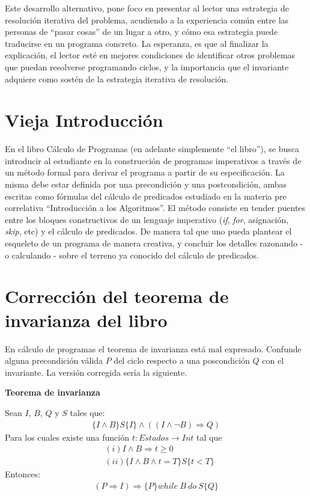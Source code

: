 \documentclass[12pt, a4paper, openany, fleqn]{book}
\begin{document}
    Este desarrollo alternativo, pone foco en presentar al lector una estrategia de resolución iterativa del problema, acudiendo a la experiencia común entre las personas de ``pasar cosas'' de un lugar a otro, y cómo esa estrategia puede traducirse en un programa concreto.
    La esperanza, es que al finalizar la explicación, el lector esté en mejores condiciones de identificar otros problemas que puedan resolverse programando ciclos, y la importancia que el invariante adquiere como sostén de la estrategia iterativa de resolución.

    \section{Vieja Introducción}
    En el libro Cálculo de Programas (en adelante simplemente ``el libro''), se busca introducir al estudiante en la construcción de programas imperativos a través de un método formal para derivar el programa a partir de su especificación. La misma debe estar definida por una precondición y una postcondición, ambas escritas como fórmulas del cálculo de predicados estudiado en la materia pre correlativa ``Introducción a los Algoritmos''. El método consiste en tender puentes entre los bloques constructivos de un lenguaje imperativo (\textit{if}, \textit{for}, asignación, \textit{skip}, etc) y el cálculo de predicados. De manera tal que uno pueda plantear el esqueleto de un programa de manera creativa, y concluir los detalles razonando - o calculando - sobre el terreno ya conocido del cálculo de predicados.

    \section{Corrección del teorema de invarianza del libro}
    En cálculo de programas el teorema de invarianza está mal expresado. Confunde alguna precondición válida $P$ del ciclo respecto a una poscondición $Q$ con el invariante.
    La versión corregida sería la siguiente.

    \vspace{1em}

    \noindent\textbf{Teorema de invarianza}

    \noindent Sean $I$, $B$, $Q$ y $S$ tales que:
    \begin{align*}
        \{I \land B\} S \{I\} \land ((I \land \lnot B) \Rightarrow Q)
    \end{align*}
    Para los cuales existe una función $t: Estados \to Int$ tal que
    \begin{align*}
        & (i) I \land B \Rightarrow t \geqslant 0 \\
        & (ii) \{I \land B \land t=T\} S \{t < T\}
    \end{align*}
    Entonces:
    \begin{align*}
        (P \Rightarrow I) \Rightarrow \{P\}while\ B\ do\ S\{Q\}
    \end{align*}
\end{document}
